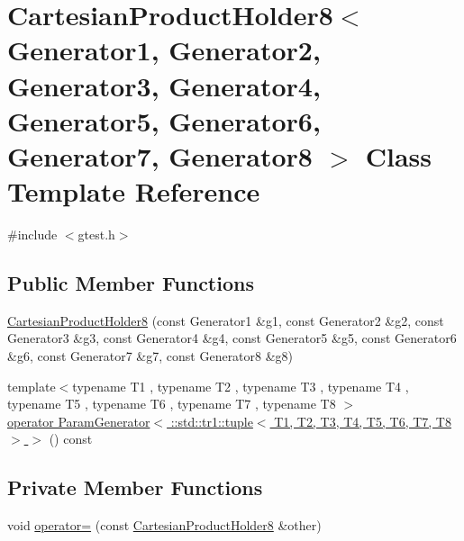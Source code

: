 \hypertarget{classtesting_1_1internal_1_1CartesianProductHolder8}{\section{\-Cartesian\-Product\-Holder8$<$ \-Generator1, \-Generator2, \-Generator3, \-Generator4, \-Generator5, \-Generator6, \-Generator7, \-Generator8 $>$ \-Class \-Template \-Reference}
\label{d6/d77/classtesting_1_1internal_1_1CartesianProductHolder8}
}


{\ttfamily \#include $<$gtest.\-h$>$}

\subsection*{\-Public \-Member \-Functions}
\begin{DoxyCompactItemize}
\item 
\hyperlink{classtesting_1_1internal_1_1CartesianProductHolder8_a268ba0e21dc9666c80ecde547def99ef}{\-Cartesian\-Product\-Holder8} (const \-Generator1 \&g1, const \-Generator2 \&g2, const \-Generator3 \&g3, const \-Generator4 \&g4, const \-Generator5 \&g5, const \-Generator6 \&g6, const \-Generator7 \&g7, const \-Generator8 \&g8)
\item 
{\footnotesize template$<$typename T1 , typename T2 , typename T3 , typename T4 , typename T5 , typename T6 , typename T7 , typename T8 $>$ }\\\hyperlink{classtesting_1_1internal_1_1CartesianProductHolder8_a86a22f4fcde16087cbf336ca0bb92ec2}{operator Param\-Generator$<$ \-::std\-::tr1\-::tuple$<$ T1, T2, T3, T4, T5, T6, T7, T8 $>$ $>$} () const 
\end{DoxyCompactItemize}
\subsection*{\-Private \-Member \-Functions}
\begin{DoxyCompactItemize}
\item 
void \hyperlink{classtesting_1_1internal_1_1CartesianProductHolder8_a2c956a3ca28fe3fd57f25e6aa45fb46b}{operator=} (const \hyperlink{classtesting_1_1internal_1_1CartesianProductHolder8}{\-Cartesian\-Product\-Holder8} \&other)
\end{DoxyCompactItemize}
